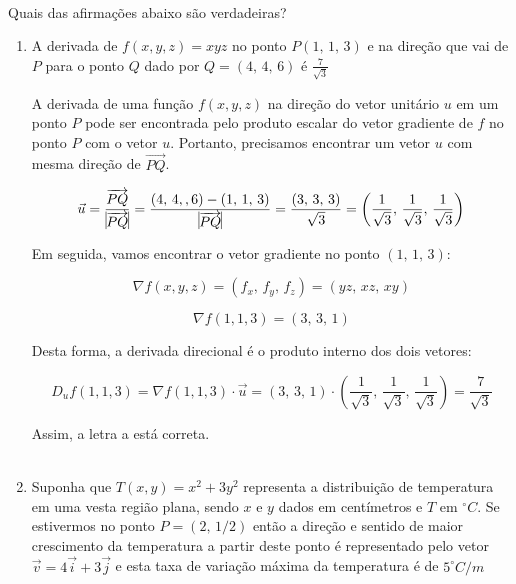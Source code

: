 \\ \\ \\
\item Quais das afirmações abaixo são verdadeiras?

\begin{enumerate}
	\item A derivada de $f(x, y, z) = xyz$ no ponto $P(1, \, 1, \, 3)$
	e na direção que vai de $P$ para o ponto $Q$ dado por $Q = (4, \, 4, \, 6)$
	é $\frac{7}{\sqrt{3}}$

	\solucao

	A derivada de uma função $f(x, y, z)$ na direção do vetor
	unitário $u$ em um ponto $P$ pode ser encontrada pelo produto
	escalar do vetor gradiente de $f$ no ponto $P$ com o vetor $u$.
	Portanto, precisamos encontrar um vetor $u$ com mesma direção de
	$\overrightarrow{PQ}$.

	$$
	\vec{u} = \frac{\overrightarrow{PQ}}{\vline \overrightarrow{PQ}\vline}
	= \frac{(4, \, 4, , 6) - (1, \, 1, \, 3)}{\vline \overrightarrow{PQ}\vline}
	= \frac{( 3, \, 3, \, 3 )}{\sqrt{3}}
	= \left( \frac{1}{\sqrt{3}}, \, \frac{1}{\sqrt{3}}, \, \frac{1}{\sqrt{3}} \right)
	$$

	Em seguida, vamos encontrar o vetor gradiente no ponto $(1, \, 1, \, 3)$:

	$$
	\nabla f(x, y, z) = \left( f_x, \, f_y, \, f_z\right)
	= \left( yz, \, xz, \, xy\right)
	$$

	$$
	\nabla f(1, 1, 3) = \left( 3, \, 3, \, 1\right)
	$$

	Desta forma, a derivada direcional é o produto interno dos dois
	vetores:

	$$
	D_u f(1, 1, 3) = \nabla f(1, 1, 3) \cdot \vec{u}
	= \left( 3, \, 3, \, 1\right) \cdot \left( \frac{1}{\sqrt{3}},
	\, \frac{1}{\sqrt{3}}, \, \frac{1}{\sqrt{3}} \right) = \frac{7}{\sqrt{3}}
	$$
	
	Assim, a letra a está correta.
	\\ \\
	\item Suponha que $T(x, y) = x^2 +3y^2$  representa a distribuição
	de temperatura em uma vesta região plana, sendo $x$ e $y$ dados em centímetros
	e $T$ em $^\circ C$. Se estivermos no ponto $P = (2, \, 1/2)$ então a direção
	e sentido de maior crescimento da temperatura a partir deste ponto é representado
	pelo vetor $\vec{v} = 4 \vec{i} + 3\vec{j}$ e esta taxa de variação máxima da temperatura
	é de $5^\circ C/m$
	
	\solucao
	

\end{enumerate}
